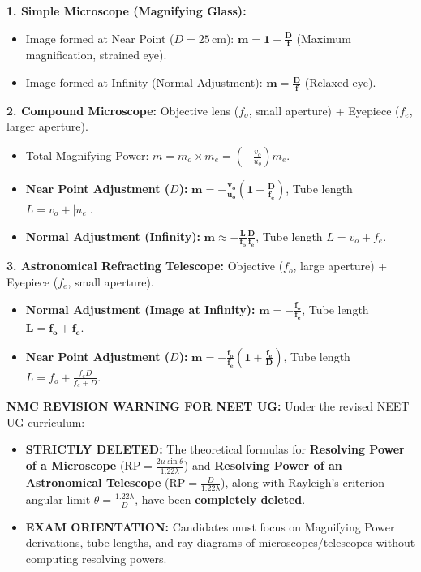 \documentclass[10pt,a4paper]{article}
\begin{document}
\begin{formulabox}
\textbf{1. Simple Microscope (Magnifying Glass):}
\begin{itemize}
  \item Image formed at Near Point ($D = 25\,\mathrm{cm}$): $\mathbf{m = 1 + \frac{D}{f}}$ (Maximum magnification, strained eye).
  \item Image formed at Infinity (Normal Adjustment): $\mathbf{m = \frac{D}{f}}$ (Relaxed eye).
\end{itemize}
\textbf{2. Compound Microscope:}
Objective lens ($f_o$, small aperture) + Eyepiece ($f_e$, larger aperture).
\begin{itemize}
  \item Total Magnifying Power: $m = m_o \times m_e = \left(-\frac{v_o}{u_o}\right) m_e$.
  \item \textbf{Near Point Adjustment ($D$):} $\mathbf{m = -\frac{v_o}{u_o}\left(1 + \frac{D}{f_e}\right)}$, Tube length $L = v_o + |u_e|$.
  \item \textbf{Normal Adjustment (Infinity):} $\mathbf{m \approx -\frac{L}{f_o}\frac{D}{f_e}}$, Tube length $L = v_o + f_e$.
\end{itemize}
\textbf{3. Astronomical Refracting Telescope:}
Objective ($f_o$, large aperture) + Eyepiece ($f_e$, small aperture).
\begin{itemize}
  \item \textbf{Normal Adjustment (Image at Infinity):} $\mathbf{m = -\frac{f_o}{f_e}}$, Tube length $\mathbf{L = f_o + f_e}$.
  \item \textbf{Near Point Adjustment ($D$):} $\mathbf{m = -\frac{f_o}{f_e}\left(1 + \frac{f_e}{D}\right)}$, Tube length $L = f_o + \frac{f_e D}{f_e + D}$.
\end{itemize}
\end{formulabox}

\begin{trapbox}
\textbf{NMC REVISION WARNING FOR NEET UG:}
Under the revised NEET UG curriculum:
\begin{itemize}
  \item \textbf{STRICTLY DELETED:} The theoretical formulas for \textbf{Resolving Power of a Microscope} ($\text{RP} = \frac{2\mu\sin\theta}{1.22\lambda}$) and \textbf{Resolving Power of an Astronomical Telescope} ($\text{RP} = \frac{D}{1.22\lambda}$), along with Rayleigh's criterion angular limit $\theta = \frac{1.22\lambda}{D}$, have been \textbf{completely deleted}.
  \item \textbf{EXAM ORIENTATION:} Candidates must focus on Magnifying Power derivations, tube lengths, and ray diagrams of microscopes/telescopes without computing resolving powers.
\end{itemize}
\end{trapbox}
\end{document}
